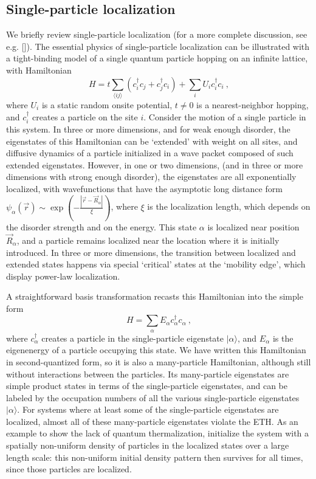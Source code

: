 \documentclass[amsmath,onecolumn, superscriptaddress,preprint,aps]{revtex4}
\renewcommand{\cite}[1]{[\onlinecite{#1}]}
\begin{document}
  \subsection{Single-particle localization}
  \label{single particle localization}
We briefly review single-particle localization (for a more complete discussion, see e.g. \cite{localizationRMP}).  The essential physics of single-particle localization
can be illustrated with a tight-binding model of a single quantum particle hopping on an infinite lattice,
with Hamiltonian
  \begin{equation}
 H =t \sum_{\langle ij \rangle} (c^{\dag}_i c_j + c^{\dag}_j c_i) + \sum_{i} U_i c^{\dag}_i c_i   ~,
 \end{equation}
 where $U_i$ is a static random onsite potential, $t\neq 0$ is a nearest-neighbor hopping, and $c^{\dag}_i$ creates a particle on the site $i$.  Consider the motion of a single particle in this system.  In three or more dimensions, and for weak enough disorder, the eigenstates of this Hamiltonian can be `extended' with weight on all sites, and diffusive dynamics of a particle initialized in a wave packet composed of such extended eigenstates.  However, in one or two dimensions, (and in three or more dimensions with strong enough disorder), the eigenstates are all exponentially localized, with wavefunctions that have the asymptotic long distance form $\psi_{\alpha}(\vec{r}) \sim \exp\left(- \frac{|\vec{r} - \vec{R}_{\alpha}|}{\xi}\right)$, where $\xi$ is the localization length, which depends on the disorder strength and on the energy.  This state $\alpha$ is localized near position $\vec{R}_{\alpha}$, and a particle remains localized near the location where it is initially introduced.  In three or more dimensions, the transition between localized and extended states happens via special `critical' states at the `mobility edge', which display power-law localization.

  A straightforward basis transformation recasts this Hamiltonian into the simple form
  \begin{equation}
  H = \sum_{\alpha} E_{\alpha} c^{\dag}_{\alpha} c_{\alpha} ~,
  \end{equation}
  where $c^{\dag}_{\alpha}$ creates a particle in the single-particle eigenstate $|\alpha\rangle$, and $E_{\alpha}$ is the eigenenergy of a particle occupying this state.
  We have written this Hamiltonian in second-quantized form, so it is also a many-particle Hamiltonian, although still without interactions between the particles.  Its many-particle eigenstates are simple product
  states in terms of the single-particle eigenstates, and can be labeled by the occupation numbers of all the various single-particle eigenstates $|\alpha\rangle$.
  For systems where at least some of the single-particle eigenstates are localized, almost all of these many-particle eigenstates
  violate the ETH.  As an example to show the lack of quantum thermalization, initialize the system with a spatially non-uniform density of particles in the localized states over a large length scale: this non-uniform initial density pattern then survives for all times, since those particles are localized.
\end{document}

